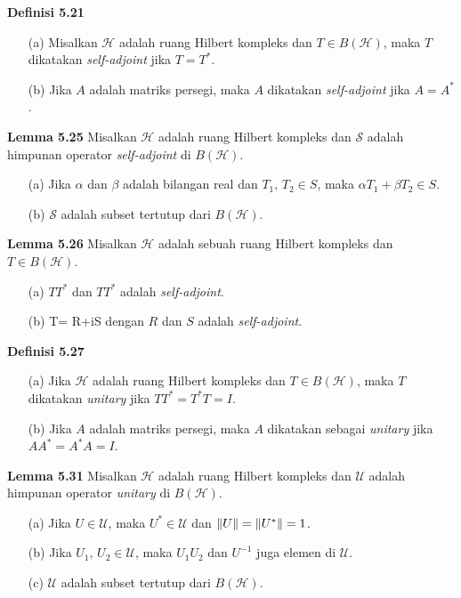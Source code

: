 \documentclass{article}
\begin{document}
\begin{multicols}{2}
  \textbf{Definisi 5.21}
  \begin{itemize}
    \item[(a)] Misalkan \(\mathcal{H}\) adalah ruang Hilbert kompleks dan \(T \in B(\mathcal{H})\), maka \(T\) dikatakan \textit{self-adjoint} jika \(T = T^*\).

    \item[(b)] Jika \(A\) adalah matriks persegi, maka \(A\) dikatakan \textit{self-adjoint} jika \(A=A^*\).
  \end{itemize}

  \textbf{Lemma 5.25} Misalkan \(\mathcal{H}\) adalah ruang Hilbert kompleks dan \(\mathcal{S}\) adalah himpunan operator \textit{self-adjoint} di \(B(\mathcal{H})\).
  \begin{itemize}
    \item[(a)] Jika \(\alpha\) dan \(\beta\) adalah bilangan real dan \(T_1,\, T_2 \in S\), maka \(\alpha T_1 + \beta T_2 \in S\).
    \item[(b)] \(\mathcal{S}\) adalah subset tertutup dari \(B(\mathcal{H})\).
  \end{itemize}

  \textbf{Lemma 5.26} Misalkan \(\mathcal{H}\) adalah sebuah ruang Hilbert kompleks dan \(T \in B(\mathcal{H})\).
  \begin{itemize}
    \item[(a)] \(TT^*\) dan \(TT^*\) adalah \textit{self-adjoint}.
    \item[(b)] T= R+iS dengan \(R\) dan \(S\) adalah \textit{self-adjoint}.
  \end{itemize}

  \textbf{Definisi 5.27}
  \begin{itemize}
    \item[(a)] Jika \(\mathcal{H}\) adalah ruang Hilbert kompleks dan \(T \in B(\mathcal{H})\), maka \(T\) dikatakan \textit{unitary} jika \(TT^* = T^*T = I\).
    \item[(b)] Jika \(A\) adalah matriks persegi, maka \(A\) dikatakan sebagai \textit{unitary} jika \(AA^* = A^*A =I\).
  \end{itemize}

  \textbf{Lemma 5.31} Misalkan \(\mathcal{H}\) adalah ruang Hilbert kompleks dan \(\mathcal{U}\) adalah himpunan operator \textit{unitary} di \(B(\mathcal{H})\).
  \begin{itemize}
    \item[(a)] Jika \(U \in \mathcal{U}\), maka \(U^* \in \mathcal{U}\) dan \(\norm{U} = \norm{U^*} = 1\).
    \item[(b)] Jika \(U_1,\, U_2 \in \mathcal{U}\), maka \(U_1U_2\) dan \(U^{-1}\) juga elemen di \(\mathcal{U}\).
    \item[(c)] \(\mathcal{U}\) adalah subset tertutup dari \(B(\mathcal{H})\).
  \end{itemize}


\end{multicols}
\end{document}
